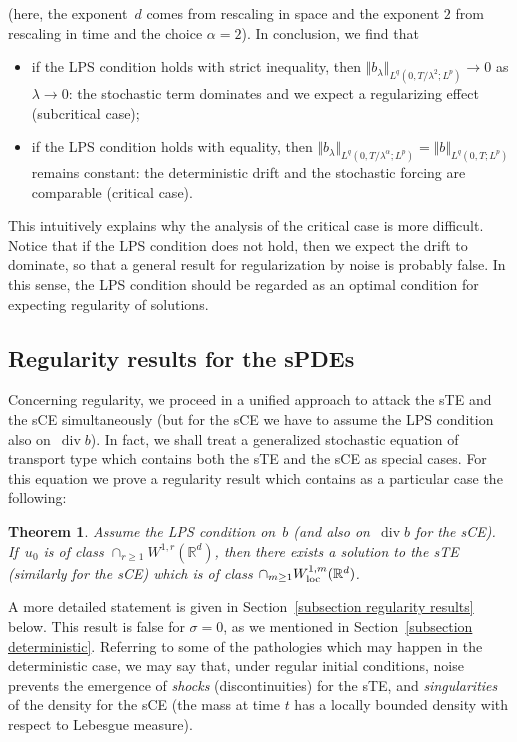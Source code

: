 \documentclass[a4paper,10pt]{article}
\newtheorem{theorem}{Theorem}[section]
\newcommand\1{\mathbbm{1}}
\newcommand\loc{{\rm loc}}
\DeclareMathOperator{\diverg}{div}
\numberwithin{equation}{section}
\begin{document}
(here, the exponent~$d$ comes from rescaling in space and the exponent $2$ from rescaling in time and the choice $\alpha =2$). In conclusion, we find that
\begin{itemize}
 \item if the LPS condition holds with strict inequality, then $\Vert b_{\lambda}\Vert_{L^{q}(0,T/\lambda^{2};L^{p})} \to 0$ as $\lambda\rightarrow0$: the stochastic term dominates and we expect a regularizing effect (subcritical case);
 \item if the LPS condition holds with equality, then $\Vert b_{\lambda}\Vert_{L^{q}(0,T/\lambda^{\alpha};L^{p}) }=\Vert b\Vert_{L^{q}(0,T;L^{p}) }$ remains constant: the deterministic drift and the stochastic forcing are comparable (critical case).
\end{itemize}

This intuitively explains why the analysis of the critical case is more difficult. Notice that if the LPS condition does not hold, then we expect the drift to dominate, so that a general result for regularization by noise is probably false. In this sense, the LPS condition should be regarded as an optimal condition for expecting regularity of solutions.

\subsection{Regularity results for the sPDEs\label{intro section regularity}}

Concerning regularity, we proceed in a unified approach to attack the sTE and the sCE simultaneously (but for the sCE we have to assume the LPS condition also on~$\diverg b$). In fact, we shall treat a generalized stochastic equation of transport type which contains both the sTE and the sCE as special cases. For this equation we prove a regularity result which contains as a particular case the following:

\begin{theorem}
Assume the LPS condition on~$b$ \textup{(}and also on~$\diverg b$ for the sCE\textup{)}. If~$u_{0}$ is of class $\cap_{r\geq1}W^{1,r}(\mathbb{R}^{d})$, then there exists a solution to the sTE \textup{(}similarly for the sCE\textup{)} which is of class $\cap_{m\geq1}W_{\loc}^{1,m}( \mathbb{R}^{d})$.
\end{theorem}

A more detailed statement is given in Section~\ref{subsection regularity results} below. This result is false for $\sigma =0$, as we mentioned in Section~\ref{subsection deterministic}. Referring to some of the pathologies which may happen in the deterministic case, we may say that, under regular
initial conditions, noise prevents the emergence of \textit{shocks} (discontinuities) for the sTE, and \textit{singularities} of the density for
the sCE (the mass at time $t$ has a locally bounded density with respect to Lebesgue measure).
\end{document}
